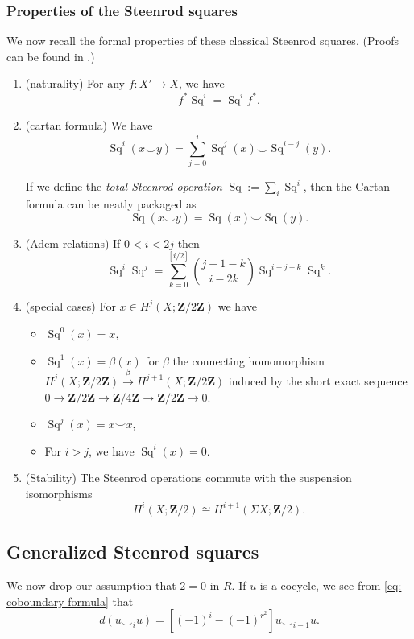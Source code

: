 \documentclass[10pt, reqno]{amsart}
\numberwithin{equation}{subsection}
\newcommand{\Z}{\mathbf{Z}}
\DeclareMathOperator{\Sq}{Sq}
\theoremstyle{remark}
\begin{document}
 \subsubsection*{Properties of the Steenrod squares} We now recall the formal properties of these classical Steenrod squares. (Proofs can be found in \cite[\S 2,3]{MoTan68}.)

\begin{enumerate}
\item ({\sc naturality}) For any $f \colon X' \rightarrow X$, we have 
\[
f^* \Sq^i = \Sq^i f^*.
\]
\item ({\sc cartan formula}) We have
\[
\Sq^i(x \smile y) = \sum_{j=0}^i \Sq^j(x) \smile \Sq^{i-j}(y).
\]


If we define the \emph{total Steenrod operation} $\Sq := \sum_i \Sq^i$, then the Cartan formula can be neatly packaged as 
\[
\Sq(x \smile y )  = \Sq(x) \smile \Sq(y).
\]


\item ({\sc Adem relations}) If $0<i<2j$ then 
\[
\Sq^i\Sq^j = \sum_{k=0}^{[i/2]} \binom{j-1-k}{i-2k} \Sq^{i+j-k} \Sq^k.
\]
\item ({\sc special cases}) For $x \in H^j(X; \Z/2\Z)$ we have 
\begin{itemize}
\item $\Sq^0(x) = x$, 
\item $\Sq^1(x) = \beta(x)$ for $\beta$ the connecting homomorphism $H^j(X; \Z/2\Z) \xrightarrow{\beta} H^{j+1}(X;\Z/2\Z)$ induced by the short exact sequence $0 \rightarrow \Z/2\Z \rightarrow \Z/4 \Z \rightarrow \Z/2\Z \rightarrow 0$.  
\item $\Sq^j (x) = x \smile x $,
\item For $i>j$, we have $\Sq^i(x)=0$. 

\end{itemize}
\item ({\sc Stability}) The Steenrod operations commute with the suspension isomorphisms 
\[
H^i(X;\Z/2) \cong H^{i+1}(\Sigma X;\Z/2).
\] 
\end{enumerate}




\subsection{Generalized Steenrod squares}\label{subsec: generalized steenrod}

We now drop our assumption that $2=0$ in $R$. If $u$ is a cocycle, we see from \eqref{eq: coboundary formula} that 
\begin{equation}\label{eq: coboundary square}
 d(u \smile_i u) = [(-1)^i  - (-1)^{r^2}] u \smile_{i-1} u . 
\end{equation}
\end{document}
